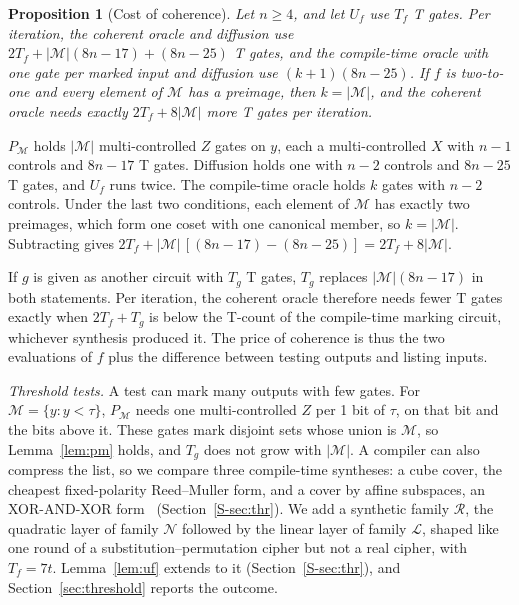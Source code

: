 \documentclass[journal]{IEEEtran}
\newtheorem{proposition}{Proposition}
\newcommand{\famL}{\mathcal{L}}
\newcommand{\famN}{\mathcal{N}}
\newcommand{\famR}{\mathcal{R}}
\begin{document}
\begin{proposition}[Cost of coherence]\label{prop:coherence}
Let $n\ge 4$, and let $U_f$ use $T_f$ T gates. Per iteration, the coherent oracle and diffusion use
$2T_f+|\mathcal{M}|(8n-17)+(8n-25)$ T gates, and the compile-time oracle with
one gate per marked input and diffusion use $(k+1)(8n-25)$. If $f$ is two-to-one
and every element of
$\mathcal{M}$ has a preimage, then $k=|\mathcal{M}|$, and the coherent oracle
needs exactly $2T_f+8|\mathcal{M}|$ more T gates per iteration.
\end{proposition}
\begin{IEEEproof}
$P_{\mathcal{M}}$ holds $|\mathcal{M}|$ multi-controlled $Z$ gates on $y$, each a
multi-controlled $X$ with $n-1$ controls and $8n-17$ T gates. Diffusion holds
one with $n-2$ controls and $8n-25$ T gates, and $U_f$ runs twice. The
compile-time oracle holds $k$ gates with $n-2$ controls. Under the last two
conditions, each element of $\mathcal{M}$ has exactly two preimages, which form one coset with one
canonical member, so $k=|\mathcal{M}|$. Subtracting gives
$2T_f+|\mathcal{M}|\,[(8n-17)-(8n-25)]=2T_f+8|\mathcal{M}|$.
\end{IEEEproof}

If $g$ is given as another circuit with $T_g$ T gates, $T_g$ replaces
$|\mathcal{M}|(8n-17)$ in both statements. Per iteration, the coherent oracle
therefore needs fewer T gates exactly when $2T_f+T_g$ is below the T-count of
the compile-time marking circuit, whichever synthesis produced it. The price of
coherence is thus the two
evaluations of $f$ plus the difference between testing outputs and listing
inputs.

\textit{Threshold tests.} A test can mark many outputs with few gates. For
$\mathcal{M}=\{y:y<\tau\}$, $P_{\mathcal{M}}$ needs one multi-controlled $Z$ per
1 bit of $\tau$, on that bit and the bits above it. These gates mark disjoint
sets whose union is $\mathcal{M}$, so Lemma~\ref{lem:pm} holds, and
$T_g$ does not grow with $|\mathcal{M}|$. A compiler can also compress the list, so we compare
three compile-time syntheses: a cube cover, the cheapest fixed-polarity
Reed--Muller form, and a cover by affine subspaces, an XOR-AND-XOR
form~\cite{bernasconi2023xor} (Section~\ref{S-sec:thr}). We add a synthetic family
$\famR$, the quadratic layer of family $\famN$ followed by the linear layer of
family $\famL$, shaped like one round of a substitution--permutation cipher but
not a real cipher, with $T_f=7t$. Lemma~\ref{lem:uf} extends to it
(Section~\ref{S-sec:thr}), and Section~\ref{sec:threshold} reports the outcome.
\end{document}
